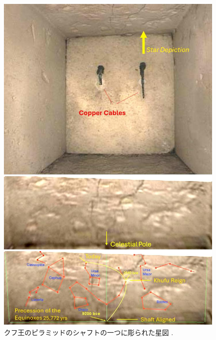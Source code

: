 \documentclass[10pt,twocolumn,letterpaper]{article}
\begin{document}
\begin{figure}[H]
\begin{center}

   \includegraphics[width=1\linewidth]{star-stone.jpg}
\end{center}
   \caption{クフ王のピラミッドのシャフトの一つに彫られた星図 \cite{28}.}
\label{fig:20}
\label{fig:onecol}
\end{figure}

\end{document}

